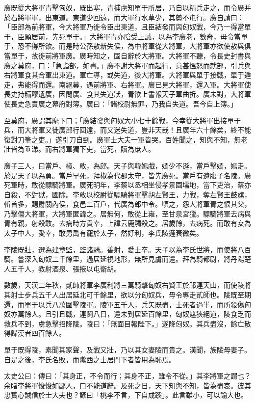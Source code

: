 \begin{pinyinscope}
廣既從大將軍青擊匈奴，既出塞，青捕虜知單于所居，乃自以精兵走之，而令廣并於右將軍軍，出東道。東道少回遠，而大軍行水草少，其勢不屯行。廣自請曰：「臣部為前將軍，今大將軍乃徙令臣出東道，且臣結發而與匈奴戰，今乃一得當單于，臣願居前，先死單于。」大將軍青亦陰受上誡，以為李廣老，數奇，毋令當單于，恐不得所欲。而是時公孫敖新失侯，為中將軍從大將軍，大將軍亦欲使敖與俱當單于，故徙前將軍廣。廣時知之，固自辭於大將軍。大將軍不聽，令長史封書與廣之莫府，曰：「急詣部，如書。」廣不謝大將軍而起行，意甚慍怒而就部，引兵與右將軍食其合軍出東道。軍亡導，或失道，後大將軍。大將軍與單于接戰，單于遁走，弗能得而還。南絕幕，遇前將軍、右將軍。廣已見大將軍，還入軍。大將軍使長史持糒醪遺廣，因問廣、食其失道狀，青欲上書報天子軍曲折。廣未對，大將軍使長史急責廣之幕府對簿。廣曰：「諸校尉無罪，乃我自失道。吾今自上簿。」

至莫府，廣謂其麾下曰；「廣結發與匈奴大小七十餘戰，今幸從大將軍出接單于兵，而大將軍又徙廣部行回遠，而又迷失道，豈非天哉！且廣年六十餘矣，終不能復對刀筆之吏。」遂引刀自剄。廣軍士大夫一軍皆哭。百姓聞之，知與不知，無老壯皆為垂涕。而右將軍獨下吏，當死，贖為庶人。

廣子三人，曰當戶、椒、敢，為郎。天子與韓嫣戲，嫣少不遜，當戶擊嫣，嫣走。於是天子以為勇。當戶早死，拜椒為代郡太守，皆先廣死。當戶有遺腹子名陵。廣死軍時，敢從驃騎將軍。廣死明年，李蔡以丞相坐侵孝景園壖地，當下吏治，蔡亦自殺，不對獄，國除。李敢以校尉從驃騎將軍擊胡左賢王，力戰，奪左賢王鼓旗，斬首多，賜爵關內侯，食邑二百戶，代廣為郎中令。頃之，怨大將軍青之恨其父，乃擊傷大將軍，大將軍匿諱之。居無何，敢從上雍，至甘泉宮獵。驃騎將軍去病與青有親，射殺敢。去病時方貴幸，上諱云鹿觸殺之。居歲餘，去病死。而敢有女為太子中人，愛幸，敢男禹有寵於太子，然好利，李氏陵遲衰微矣。

李陵既壯，選為建章監，監諸騎。善射，愛士卒。天子以為李氏世將，而使將八百騎。嘗深入匈奴二千餘里，過居延視地形，無所見虜而還。拜為騎都尉，將丹陽楚人五千人，教射酒泉、張掖以屯衛胡。

數歲，天漢二年秋，貳師將軍李廣利將三萬騎擊匈奴右賢王於祁連天山，而使陵將其射士步兵五千人出居延北可千餘里，欲以分匈奴兵，毋令專走貳師也。陵既至期還，而單于以兵八萬圍擊陵軍。陵軍五千人，兵矢既盡，士死者過半，而所殺傷匈奴亦萬餘人。且引且戰，連鬬八日，還未到居延百餘里，匈奴遮狹絕道，陵食乏而救兵不到，虜急擊招降陵。陵曰：「無面目報陛下。」遂降匈奴。其兵盡沒，餘亡散得歸漢者四百餘人。

單于既得陵，素聞其家聲，及戰又壯，乃以其女妻陵而貴之。漢聞，族陵母妻子。自是之後，李氏名敗，而隴西之士居門下者皆用為恥焉。

太史公曰：傳曰：「其身正，不令而行；其身不正，雖令不從。」其李將軍之謂也？余睹李將軍悛悛如鄙人，口不能道辭。及死之日，天下知與不知，皆為盡哀。彼其忠實心誠信於士大夫也？諺曰「桃李不言，下自成蹊」。此言雖小，可以諭大也。


\end{pinyinscope}